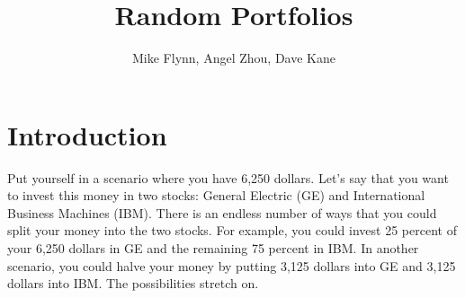 \documentclass{article}\usepackage{graphicx, color}
\begin{document}
\title{Random Portfolios}
\author{Mike Flynn, Angel Zhou, Dave Kane}
\maketitle

\section*{Introduction}




Put yourself in a scenario where you have 6,250 dollars. Let's say that you want to invest this money in two stocks: General Electric (GE) and International Business Machines (IBM). There is an endless number of ways that you could split your money into the two stocks. For example, you could invest 25 percent of your 6,250 dollars in GE and the remaining 75 percent in IBM. In another scenario, you could halve your money by putting 3,125 dollars into GE and 3,125 dollars into IBM. The possibilities stretch on.
\end{document}
